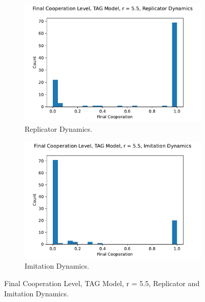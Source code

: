 \FloatBarrier 
\begin{figure}[!h]
  \begin{subfigure}[b]{0.45\textwidth}
    \includegraphics[width=1.1\textwidth]{images/Rep_coop_histo_TAG_55.pdf}
    \caption{Replicator Dynamics. }
    \label{Rep_TAG_55_coop_histo}
  \end{subfigure}
  \hfill
  \begin{subfigure}[b]{0.45\textwidth}
    \includegraphics[width=1.1\textwidth]{images/ID_coop_histo_TAG_55.pdf}
    \caption{Imitation Dynamics. }
    \label{ID_TAG_55_coop_histo}
  \end{subfigure}
  \caption{Final Cooperation Level, TAG Model, r = 5.5, Replicator and Imitation Dynamics. } \label{coop_histo_TAG}
\end{figure} 
\FloatBarrier

